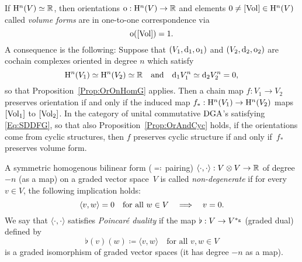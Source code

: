 \documentclass[\MainFolder/Text.tex]{subfiles}
\begin{document}
\begin{Remark}\label{Rem:VolForms}
If $\mathrm{H}^n(V) \simeq \mathbb{R}$, then orientations $\mathrm{o}: \mathrm{H}^n(V)\rightarrow\mathbb{R}$  and elements $0\neq [\mathrm{Vol}] \in \mathrm{H}^n(V)$ called \emph{volume forms} are in one-to-one correspondence via
$$ \mathrm{o}([\mathrm{Vol}]) = 1. $$
A consequence is the following:
Suppose that $(V_1,\mathrm{d}_1,\mathrm{o}_1)$ and $(V_2,\mathrm{d}_2,\mathrm{o}_2)$ are cochain complexes oriented in degree $n$ which satisfy 
\begin{equation}\label{Eq:SDDFG}
\mathrm{H}^n(V_1)\simeq\mathrm{H}^n(V_2)\simeq\mathbb{R}\quad\text{and}\quad\mathrm{d}_1 V_1^n \simeq \mathrm{d}_2 V_2^n = 0,
\end{equation}
so that Proposition~\ref{Prop:OrOnHomG} applies. Then a chain map $f: V_1 \rightarrow V_2$ preserves orientation if and only if the induced map $f_*: \mathrm{H}^n(V_1) \rightarrow \mathrm{H}^n(V_2)$ maps $[\mathrm{Vol}_1]$ to $[\mathrm{Vol}_2]$. In the category of unital commutative $\mathrm{DGA}$'s satisfying \eqref{Eq:SDDFG}, so that also Proposition~\ref{Prop:OrAndCyc} holds, if the orientations come from cyclic structures, then $f$ preserves cyclic structure if and only if~$f_*$ preserves volume form.
\end{Remark}



\begin{Definition}\label{Def:PoincDual}
A symmetric homogenous bilinear form ($\eqqcolon$\,pairing) $\langle\cdot,\cdot\rangle: V\otimes V \rightarrow \mathbb{R}$ of degree $-n$ (as a map) on a graded vector space~$V$ is called \emph{non-degenerate} if for every $v\in V$, the following implication holds:
$$ \langle v,w \rangle= 0\quad\text{for all }w\in V\quad\Longrightarrow\quad v=0. $$
We say that $\langle\cdot,\cdot\rangle$ satisfies \emph{Poincar\'e duality} if the map $\flat: V \rightarrow V^{*_{\mathrm{g}}}$ (graded dual) defined by 
$$\flat(v)(w) \coloneqq \langle v,w\rangle\quad \text{for all }v,w\in V$$
is a graded isomorphism of graded vector spaces (it has degree $-n$ as a map).
\end{Definition}
\end{document}
